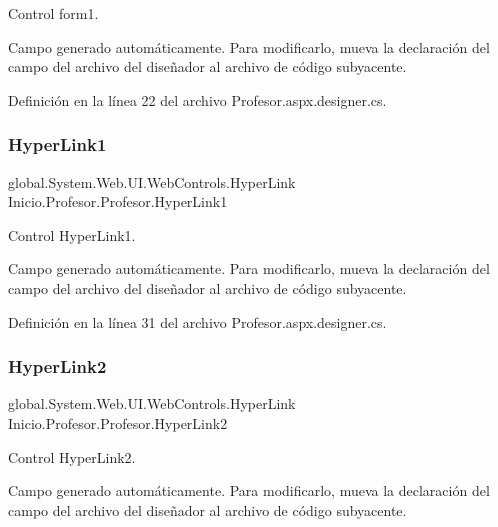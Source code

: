 Control form1. 

Campo generado automáticamente. Para modificarlo, mueva la declaración del campo del archivo del diseñador al archivo de código subyacente. 

Definición en la línea 22 del archivo Profesor.\+aspx.\+designer.\+cs.

\mbox{\label{classInicio_1_1Profesor_1_1Profesor_ad9b39bf7cbebc1512506a47d54b83d27}} 
\subsubsection{\texorpdfstring{HyperLink1}{HyperLink1}}
{\footnotesize\ttfamily global.\+System.\+Web.\+U\+I.\+Web\+Controls.\+Hyper\+Link Inicio.\+Profesor.\+Profesor.\+Hyper\+Link1\hspace{0.3cm}{\ttfamily [protected]}}



Control Hyper\+Link1. 

Campo generado automáticamente. Para modificarlo, mueva la declaración del campo del archivo del diseñador al archivo de código subyacente. 

Definición en la línea 31 del archivo Profesor.\+aspx.\+designer.\+cs.

\mbox{\label{classInicio_1_1Profesor_1_1Profesor_a6c75c55a1c83aa317b4cb4627e3a48cb}} 
\subsubsection{\texorpdfstring{HyperLink2}{HyperLink2}}
{\footnotesize\ttfamily global.\+System.\+Web.\+U\+I.\+Web\+Controls.\+Hyper\+Link Inicio.\+Profesor.\+Profesor.\+Hyper\+Link2\hspace{0.3cm}{\ttfamily [protected]}}



Control Hyper\+Link2. 

Campo generado automáticamente. Para modificarlo, mueva la declaración del campo del archivo del diseñador al archivo de código subyacente. 

